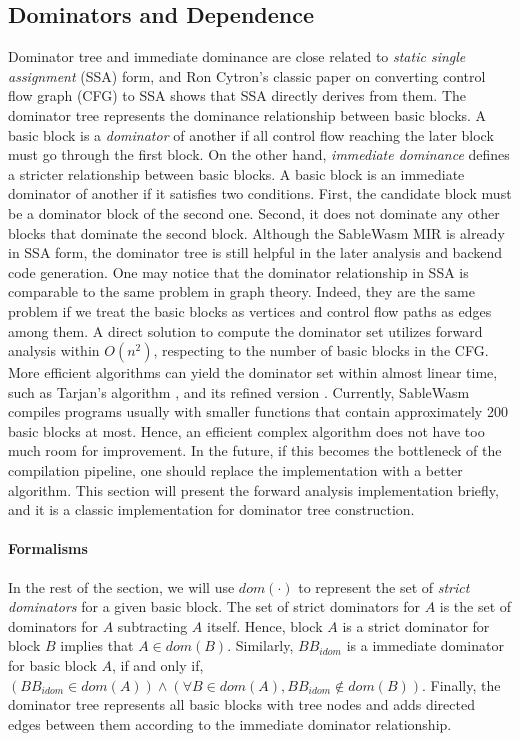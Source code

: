 \subsection{Dominators and Dependence}

Dominator tree and immediate dominance are close related to \emph{static single
    assignment} (SSA) form, and Ron Cytron's classic paper on converting
control flow graph (CFG) to SSA \cite{ibm-ssa} shows that SSA directly derives
from them. The dominator tree represents the dominance relationship between
basic blocks. A basic block is a \emph{dominator} of another if all control flow
reaching the later block must go through the first block. On the other hand,
\emph{immediate dominance} defines a stricter relationship between basic blocks.
A basic block is an immediate dominator of another if it satisfies two
conditions. First, the candidate block must be a dominator block of the second
one. Second, it does not dominate any other blocks that dominate the second
block. Although the SableWasm MIR is already in SSA form, the dominator tree is
still helpful in the later analysis and backend code generation. One may notice
that the dominator relationship in SSA is comparable to the same problem in
graph theory. Indeed, they are the same problem if we treat the basic blocks as
vertices and control flow paths as edges among them.  A direct solution to
compute the dominator set utilizes forward analysis within $O(n^2)$, respecting
to the number of basic blocks in the CFG. More efficient algorithms can yield
the dominator set within almost linear time, such as Tarjan's algorithm
\cite{tarjan-fast-dominator}, and its refined version
\cite{tarjan-fast-dominator-improved}. Currently, SableWasm compiles programs
usually with smaller functions that contain approximately 200 basic blocks at
most. Hence, an efficient complex algorithm does not have too much room for
improvement. In the future, if this becomes the bottleneck of the compilation
pipeline, one should replace the implementation with a better algorithm. This
section will present the forward analysis implementation briefly, and it is a
classic implementation for dominator tree construction.

\paragraph{Formalisms}
In the rest of the section, we will use $dom(\cdot)$ to represent the set of
\emph{strict dominators} for a given basic block. The set of strict dominators
for $A$ is the set of dominators for $A$ subtracting $A$ itself. Hence, block
$A$ is a strict dominator for block $B$ implies that $A \in dom(B)$. Similarly,
$BB_{idom}$ is a immediate dominator for basic block $A$, if and only if,
$(BB_{idom} \in dom(A)) \land (\forall B \in dom(A), BB_{idom} \notin dom(B))$.
Finally, the dominator tree represents all basic blocks with tree nodes and adds
directed edges between them according to the immediate dominator relationship.

